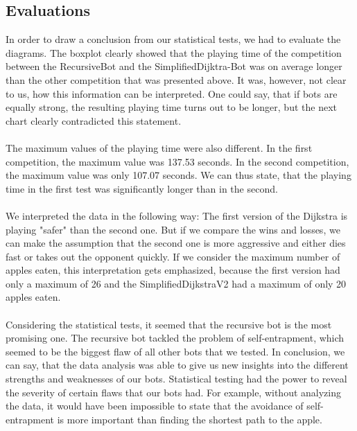 \documentclass[a4paper,12pt]{article}
\begin{document}
\subsection{Evaluations}
In order to draw a conclusion from our statistical tests, we had to evaluate the diagrams. The boxplot clearly showed that the playing time of the competition between the RecursiveBot and the SimplifiedDijktra-Bot was on average longer than the other competition that was presented above. It was, however, not clear to us, how this information can be interpreted. One could say, that if bots are equally strong, the resulting playing time turns out to be longer, but the next chart clearly contradicted this statement.\\
\\ The maximum values of the playing time were also different. In the first competition, the maximum value was  137.53 seconds. In the second competition, the maximum value was only 107.07 seconds. We can thus state, that the playing time in the first test was significantly longer than in the second. \\
\\We interpreted the data in the following way: The first version of the Dijkstra is playing "safer" than the second one. But if we compare the wins and losses, we can make the assumption that the second one is more aggressive and either dies fast or takes out the opponent quickly. If we consider the maximum number of apples eaten, this interpretation gets emphasized, because the first version had only a maximum of 26  and the SimplifiedDijkstraV2 had a maximum of only 20 apples eaten.\\
\\Considering the statistical tests, it seemed that the recursive bot is the most promising one. The recursive bot tackled the problem of self-entrapment, which  seemed to be the biggest flaw of all other bots that we tested. 
In conclusion,  we can say, that the data analysis was able to give us new insights into the different strengths and weaknesses of our bots.  Statistical testing had the power to reveal the severity of certain flaws that our bots had. For example, without analyzing the data, it would have been impossible to state that the avoidance of self-entrapment is more important than finding the shortest path to the apple.  
\end{document}
